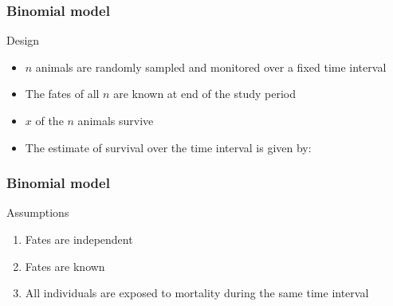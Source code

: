 \documentclass[color=usenames,dvipsnames]{beamer}\usepackage[]{graphicx}\usepackage[]{color}
\begin{document}
\begin{frame}
  \frametitle{Binomial model}
  \large
  {%
    Design}
  \begin{itemize}%
    \normalsize
    \item<1-> $n$ animals are randomly sampled and monitored over a fixed time interval
    \item<2-> The fates of all $n$ are known at end of the study period
    \item<3-> $x$ of the $n$ animals survive
    \item<4-> The estimate of survival over the time interval is given by:
  \end{itemize}
  \pause
  \Large
  \vspace{0.5cm}
\end{frame}



\begin{frame}
  \frametitle{Binomial model}
  \large
  {%
    Assumptions}
  \begin{enumerate}[(1)]%
    \normalsize
    \item<1-> Fates are independent
    \item<1-> Fates are known
    \item<1-> All individuals are exposed to mortality during the same time interval
  \end{enumerate}
  \vspace{0.5cm}
  \vspace{0.5cm}
\end{frame}
\end{document}
